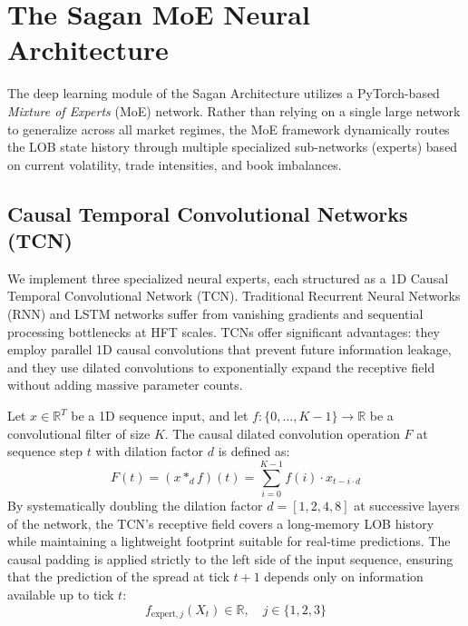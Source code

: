 \documentclass[11pt,a4paper]{article}
\begin{document}
\section{The Sagan MoE Neural Architecture}
The deep learning module of the Sagan Architecture utilizes a PyTorch-based \textit{Mixture of Experts} (MoE) network. Rather than relying on a single large network to generalize across all market regimes, the MoE framework dynamically routes the LOB state history through multiple specialized sub-networks (experts) based on current volatility, trade intensities, and book imbalances.

\subsection{Causal Temporal Convolutional Networks (TCN)}
We implement three specialized neural experts, each structured as a 1D Causal Temporal Convolutional Network (TCN). Traditional Recurrent Neural Networks (RNN) and LSTM networks suffer from vanishing gradients and sequential processing bottlenecks at HFT scales. TCNs offer significant advantages: they employ parallel 1D causal convolutions that prevent future information leakage, and they use dilated convolutions to exponentially expand the receptive field without adding massive parameter counts.

Let $x \in \mathbb{R}^T$ be a 1D sequence input, and let $f: \{0, \dots, K-1\} \to \mathbb{R}$ be a convolutional filter of size $K$. The causal dilated convolution operation $F$ at sequence step $t$ with dilation factor $d$ is defined as:
\begin{equation}
    F(t) = (x *_d f)(t) = \sum_{i=0}^{K-1} f(i) \cdot x_{t - i \cdot d}
\end{equation}
By systematically doubling the dilation factor $d = [1, 2, 4, 8]$ at successive layers of the network, the TCN's receptive field covers a long-memory LOB history while maintaining a lightweight footprint suitable for real-time predictions. The causal padding is applied strictly to the left side of the input sequence, ensuring that the prediction of the spread at tick $t+1$ depends only on information available up to tick $t$:
\begin{equation}
    f_{\text{expert}, j}(X_t) \in \mathbb{R}, \quad j \in \{1, 2, 3\}
\end{equation}
\end{document}
